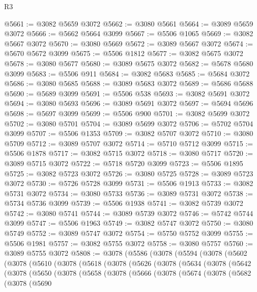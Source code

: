 \begin{lexlean}{R3}
\begin{coremodule}
@5661 := @3082 @5659 @3072
@5662 := @3080 @5661
@5664 := @3089 @5659 @3072
@5666 := @5662 @5664 @3099
@5667 := @5506 @1065
@5669 := @3082 @5667 @3072
@5670 := @3080 @5669
@5672 := @3089 @5667 @3072
@5674 := @5670 @5672 @3099
@5675 := @5506 @1812
@5677 := @3082 @5675 @3072
@5678 := @3080 @5677
@5680 := @3089 @5675 @3072
@5682 := @5678 @5680 @3099
@5683 := @5506 @911
@5684 := @3082 @5683
@5685 := @5684 @3072
@5686 := @3080 @5685
@5688 := @3089 @5683 @3072
@5689 := @5686 @5688
@5690 := @5689 @3099
@5691 := @5506 @538
@5693 := @3082 @5691 @3072
@5694 := @3080 @5693
@5696 := @3089 @5691 @3072
@5697 := @5694 @5696
@5698 := @5697 @3099
@5699 := @5506 @900
@5701 := @3082 @5699 @3072
@5702 := @3080 @5701
@5704 := @3089 @5699 @3072
@5706 := @5702 @5704 @3099
@5707 := @5506 @1353
@5709 := @3082 @5707 @3072
@5710 := @3080 @5709
@5712 := @3089 @5707 @3072
@5714 := @5710 @5712 @3099
@5715 := @5506 @1878
@5717 := @3082 @5715 @3072
@5718 := @3080 @5717
@5720 := @3089 @5715 @3072
@5722 := @5718 @5720 @3099
@5723 := @5506 @1895
@5725 := @3082 @5723 @3072
@5726 := @3080 @5725
@5728 := @3089 @5723 @3072
@5730 := @5726 @5728 @3099
@5731 := @5506 @1913
@5733 := @3082 @5731 @3072
@5734 := @3080 @5733
@5736 := @3089 @5731 @3072
@5738 := @5734 @5736 @3099
@5739 := @5506 @1938
@5741 := @3082 @5739 @3072
@5742 := @3080 @5741
@5744 := @3089 @5739 @3072
@5746 := @5742 @5744 @3099
@5747 := @5506 @1963
@5749 := @3082 @5747 @3072
@5750 := @3080 @5749
@5752 := @3089 @5747 @3072
@5754 := @5750 @5752 @3099
@5755 := @5506 @1981
@5757 := @3082 @5755 @3072
@5758 := @3080 @5757
@5760 := @3089 @5755 @3072
@5808 := @3078
    (@5586
      (@3078
        (@5594
          (@3078
            (@5602
              (@3078
                (@5610
                  (@3078
                    (@5618
                      (@3078
                        (@5626
                          (@3078
                            (@5634
                              (@3078
                                (@5642
                                  (@3078
                                    (@5650
                                      (@3078
                                        (@5658
                                          (@3078
                                            (@5666
                                              (@3078
                                                (@5674
                                                  (@3078
                                                    (@5682
                                                      (@3078
                                                        (@5690

\end{coremodule}
\end{lexlean}

